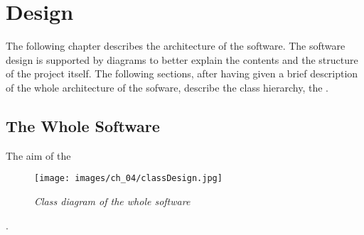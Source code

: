 \chapter{Design}
 
  The following chapter describes the architecture of the software. 
  The software design is supported by diagrams to better explain the contents and the structure of the project itself. The following sections, after having given a brief description of the whole architecture of the sofware, describe the class hierarchy, the .
  
  \section{The Whole Software}
  The aim of the 
  \begin{figure}[h]
	  \begin{center} 
	    \texttt{[image: images/ch\_04/classDesign.jpg]}
	  \end{center} 
	  \caption{\textit{Class diagram of the whole software }}  
	  \label{fig:modulesActr}
  \end{figure}
  .

  
